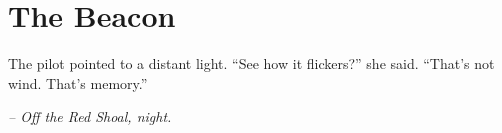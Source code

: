 \chapter*{The Beacon}

The pilot pointed to a distant light. ``See how it flickers?'' she said. ``That's not wind. That's memory.''

\smallskip

\noindent \textit{-- Off the Red Shoal, night.}

